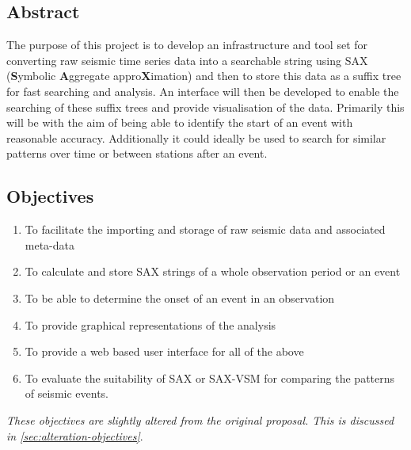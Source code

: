 \documentclass[../report.tex]{subfiles}
\begin{document}
\subsection{Abstract}

	The purpose of this project is to develop an infrastructure and tool set for converting raw seismic time series data into a searchable string using SAX (\textbf{S}ymbolic \textbf{A}ggregate appro\textbf{X}imation) and then to store this data as a suffix tree for fast searching and analysis.  An interface will then be developed to enable the searching of these suffix trees and provide visualisation of the data.  Primarily this will be with the aim of being able to identify the start of an event with reasonable accuracy.  Additionally it could ideally be used to search for similar patterns over time or between stations after an event.
	
\subsection{Objectives} \label{sec:objectives}
	\begin{enumerate}
		\item To facilitate the importing and storage of raw seismic data and associated meta-data
		\item To calculate and store SAX strings of a whole observation period or an event
		\item To be able to determine the onset of an event in an observation
		\item To provide graphical representations of the analysis
		\item To provide a web based user interface for all of the above
		\item To evaluate the suitability of SAX or SAX-VSM for comparing the patterns of seismic events.
	\end{enumerate}

	\textit{These objectives are slightly altered from the original proposal.  This is discussed in \cref{sec:alteration-objectives}}.
		
\end{document}
